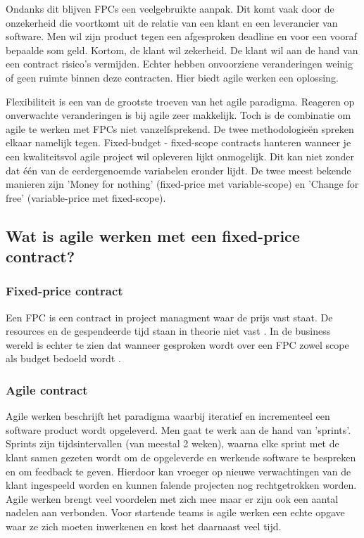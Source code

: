 \documentclass{hogent-article}
\begin{document}
    Ondanks dit blijven FPCs een veelgebruikte aanpak. Dit komt vaak door de onzekerheid die voortkomt uit de relatie van een klant en een leverancier van software. Men wil zijn product tegen een afgesproken deadline en voor een vooraf bepaalde som geld. Kortom, de klant wil zekerheid. De klant wil aan de hand van een contract risico's vermijden. Echter hebben onvoorziene veranderingen 
    weinig of geen ruimte binnen deze contracten. Hier biedt agile werken een oplossing.
    
    Flexibiliteit is een van de grootste troeven van het agile paradigma. Reageren op onverwachte veranderingen is bij agile zeer makkelijk. Toch is de combinatie om agile te werken met FPCs niet vanzelfsprekend. De twee methodologieën spreken elkaar namelijk tegen. Fixed-budget - fixed-scope contracts hanteren wanneer je een kwaliteitsvol agile project wil opleveren lijkt onmogelijk. Dit kan niet zonder dat één van de eerdergenoemde variabelen eronder lijdt. De twee meest bekende manieren zijn 'Money for nothing' (fixed-price met variable-scope) en 'Change for free' (variable-price met fixed-scope). 
	
    \subsection{Wat is agile werken met een fixed-price contract?}
    \subsubsection{Fixed-price contract}
     Een FPC is een contract in project managment waar de prijs vast staat. De resources en de gespendeerde tijd staan in theorie niet vast \autocite{PMK}. In de business wereld is echter te zien dat wanneer gesproken wordt over een FPC zowel scope als budget bedoeld wordt \autocite{PMI2011}.
     \subsubsection{Agile contract}
     Agile werken beschrijft het paradigma waarbij iteratief en incrementeel een software product wordt opgeleverd. Men gaat te werk aan de hand van 'sprints'. Sprints zijn tijdsintervallen (van meestal 2 weken), waarna elke sprint met de klant samen gezeten wordt om de opgeleverde en werkende software te bespreken en om feedback te geven. Hierdoor kan vroeger op nieuwe verwachtingen van de klant ingespeeld worden en kunnen falende projecten nog rechtgetrokken worden. Agile werken brengt veel voordelen met zich mee maar er zijn ook een aantal nadelen aan verbonden. Voor startende teams is agile werken een echte opgave waar ze zich moeten inwerkenen en kost het daarnaast veel tijd.
    
\end{document}
